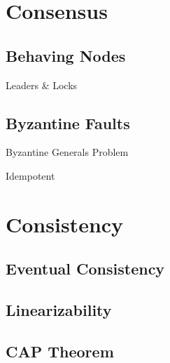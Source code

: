 \section{Consensus}

\subsection{Behaving Nodes}
Leaders \& Locks

\subsection{Byzantine Faults}
Byzantine Generals Problem

Idempotent

\section{Consistency}

\subsection{Eventual Consistency}

\subsection{Linearizability}

\subsection{CAP Theorem}

